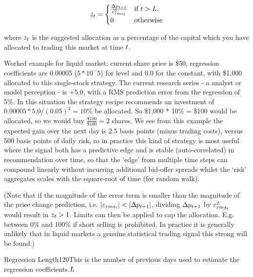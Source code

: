 \documentclass{article}%
\begin{document}
\vspace{1mm}
\begin{equation}
    z_t = 
    \begin{cases}
    \frac{\Delta p_{t+1}}{\varepsilon^{{2}}_{rms_{t}}} & \text{if } t > L,\\
    0                                        & \text{otherwise}
    \end{cases}
\end{equation}



\vspace{1mm}
\justify where $z_t$ is the suggested allocation as a percentage of the capital which you have allocated to trading this market at time $t$.

\justify Worked example for liquid market:  current share price is \$50, regression coefficients are 0.00005 ($5 * 10^-5$) for level and 0.0 for the constant, with \$1,000 allocated to this single-stock strategy.  The current research series - a analyst or model perception - is +5.0, with a RMS prediction error from the regression of 5\%. In this situation the strategy recipe recommends an investment of $0.00005 * 5.0 / (0.05)^2 = 10\%$ be allocated. So \$1,000 * 10\% = \$100 would be allocated, so we would buy $\frac{\$100}{\$100} = 2$ shares.
We see from this example the expected gain over the next day is 2.5 basis points (minus trading costs), versus 500 basis points of daily risk, so in practice this kind of strategy is most useful where the signal both has a predictive edge and is stable (auto-correlated) in recommendation over time, so that the `edge' from multiple time steps can compound linearly without incurring additional bid-offer spreads whilst the `risk' aggregates scales with the square-root of time (for random walk).


\vspace{1mm}
\justify (Note that if the magnitude of the error term is smaller than the magnitude of the price change prediction, i.e. $|\varepsilon_{rms_{t}}| < |\Delta p_{t+1}|$, dividing $\Delta p_{t+1}$ by $\varepsilon^{{2}}_{rms_{t}}$ would result in $z_t>1$. Limits can then be applied to cap the allocation. E.g. between 0\% and 100\% if short selling is prohibited. In practice it is generally unlikely that in liquid markets a genuine statistical trading signal this strong will be found.)

{Regression Length}{120}{This is the number of previous days used to estimate the regression coefficients.}{$L$}%
\stoptable 
\end{document}
